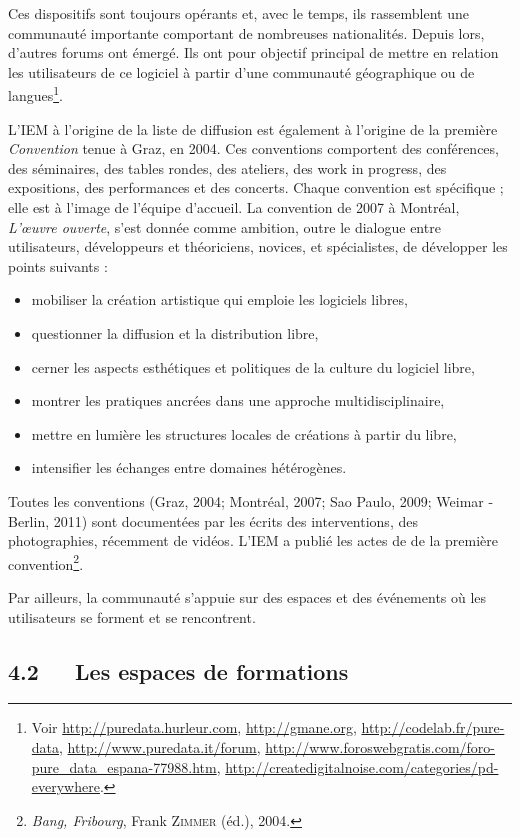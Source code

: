 \documentclass{FramateX}
\begin{document}
\begin{refsection}
Ces dispositifs sont toujours opérants et, avec le temps, ils
rassemblent une communauté importante comportant de nombreuses
nationalités. Depuis lors, d'autres forums ont émergé. Ils ont pour
objectif principal de mettre en relation les utilisateurs de ce
logiciel à partir d'une communauté géographique ou de
langues\footnote{Voir \url{http://puredata.hurleur.com}, \url{http://gmane.org},
\url{http://codelab.fr/pure-data}, \url{http://www.puredata.it/forum},
\url{http://www.foroswebgratis.com/foro-pure\_data\_espana-77988.htm}, \url{http://createdigitalnoise.com/categories/pd-everywhere}.}.

L'IEM à l'origine de la liste de diffusion est également à l'origine de
la première \textit{Convention} tenue à Graz, en 2004. Ces conventions comportent des
conférences, des séminaires, des tables rondes, des ateliers, des
work in progress, des expositions, des performances et des concerts.
Chaque convention est spécifique ; elle est à l'image de l'équipe
d'accueil. La convention de 2007 à Montréal, \textit{L'œuvre ouverte}, s'est
donnée comme ambition, outre le dialogue entre utilisateurs,
développeurs et théoriciens, novices, et spécialistes, de développer
les points suivants :

\begin{itemize}
\item mobiliser la création artistique qui emploie les logiciels libres,
\item questionner la diffusion et la distribution libre,
\item cerner les aspects esthétiques et politiques de la culture du
logiciel libre,
\item montrer les pratiques ancrées dans une approche
multidisciplinaire,
\item mettre en lumière les structures locales de créations à partir du
libre,
\item intensifier les échanges entre domaines hétérogènes. 
\end{itemize}
Toutes les conventions (Graz, 2004; Montréal, 2007; Sao Paulo, 2009;
Weimar - Berlin, 2011) sont documentées par les écrits des
interventions, des photographies, récemment de vidéos. L'IEM a publié
les actes de de la première convention\footnote{\textit{Bang, Fribourg}, Frank \textsc{Zimmer} (éd.), 2004.}.

Par ailleurs, la communauté s'appuie sur des espaces et
des événements où les utilisateurs se forment et se rencontrent.

\subsection*{4.2~~~Les espaces de formations}
{}


\end{refsection}
\end{document}

